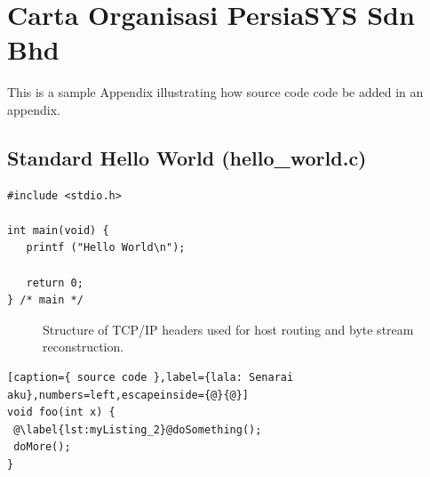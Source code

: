 \chapter{Carta Organisasi PersiaSYS Sdn Bhd}%


This is a sample Appendix illustrating how source code code be added
in an appendix.

\section{Standard Hello World (hello\_world.c)}

{\footnotesize\renewcommand{\baselinestretch}{1.0}
\begin{verbatim}
#include <stdio.h>

int main(void) {
   printf ("Hello World\n");

   return 0;
} /* main */
\end{verbatim}}

\begin{figure}
    \caption[Structure of TCP/IP headers]{Structure of TCP/IP headers used for host
    routing and byte stream reconstruction.}
    \label{c2:f1}
\end{figure}


\begin{lstlisting}[caption={ source code },label={lala: Senarai aku},numbers=left,escapeinside={@}{@}]
void foo(int x) {
 @\label{lst:myListing_2}@doSomething();
 doMore();
}
\end{lstlisting}

